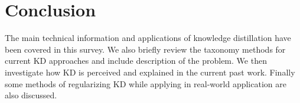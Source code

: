 \section{Conclusion}
The main technical information and applications of knowledge distillation have been covered in this survey.
We also briefly review the taxonomy methods for current KD approaches and include description of the problem. We then investigate how KD is perceived and explained in the current past work. Finally some methods of regularizing KD while applying in real-world application are also discussed.